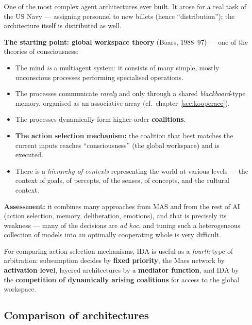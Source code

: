 \documentclass[11pt,a4paper]{article}
\theoremstyle{definition}
\providecommand{\uv}[1]{``#1''}
\begin{document}
\begin{defbox}
One of the most complex agent architectures ever built. It arose for a real task of the US Navy ---
assigning personnel to new billets (hence \uv{distribution}); the architecture itself is distributed
as well.

\textbf{The starting point: global workspace theory} (Baars, 1988--97) --- one of the theories of
consciousness:
\begin{itemize}
\item The mind \emph{is} a multiagent system: it consists of many simple, mostly unconscious
  processes performing specialised operations.
\item The processes communicate \emph{rarely} and only through a shared \emph{blackboard}-type
  memory, organised as an associative array (cf.\ chapter~\ref{sec:kooperace}).
\item The processes dynamically form higher-order \textbf{coalitions}.
\item \textbf{The action selection mechanism:} the coalition that best matches the current inputs
  reaches \uv{consciousness} (the global workspace) and is executed.
\item There is a \emph{hierarchy of contexts} representing the world at various levels --- the
  context of goals, of percepts, of the senses, of concepts, and the cultural context.
\end{itemize}
\textbf{Assessment:} it combines many approaches from MAS and from the rest of AI (action selection,
memory, deliberation, emotions), and that is precisely its weakness --- many of the decisions are
\emph{ad hoc}, and tuning such a heterogeneous collection of models into an optimally cooperating
whole is very difficult.
\end{defbox}

For comparing action selection mechanisms, IDA is useful as a \emph{fourth} type of arbitration:
subsumption decides by \textbf{fixed priority}, the Maes network by \textbf{activation level},
layered architectures by a \textbf{mediator function}, and IDA by the \textbf{competition of
dynamically arising coalitions} for access to the global workspace.

\subsection{Comparison of architectures}
\end{document}
